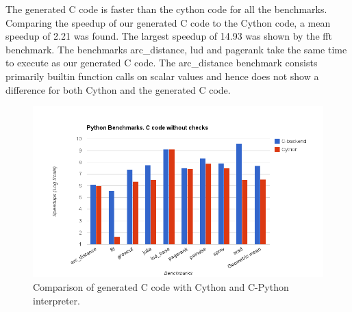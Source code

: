 The generated C code is faster than the cython code for all the benchmarks. Comparing the speedup of our generated C code to the Cython code, a mean speedup of 2.21 was found. The largest speedup of 14.93 was shown by the fft benchmark. The benchmarks arc\_distance, lud and pagerank take the same time to execute as our generated C code. The arc\_distance benchmark consists primarily builtin function calls on scalar values and hence does not show a difference for both Cython and the generated C code. 
\begin{figure}[htbp]
\centering
\includegraphics[scale=0.5]{Figures/results_cwochecks_py.png}
\caption{Comparison of generated C code with Cython and C-Python interpreter.}
\label{fig:results_cwochecks_py}
\end{figure}
